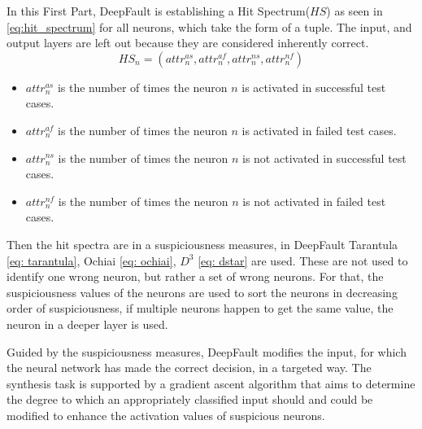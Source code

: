 In this First Part, DeepFault is establishing a Hit Spectrum($HS$) as seen in \ref{eq:hit_spectrum} for all neurons, which take the form of a tuple.
The input, and output layers are left out because they are considered inherently correct.
\begin{equation}
    HS_n = (attr_n^{as}, attr_n^{af}, attr_n^{ns}, attr_n^{nf})\label{eq:hit_spectrum}
\end{equation}
\begin{itemize}
    \item $attr^{as}_n$ is the number of times the neuron $n$ is activated in successful test cases.
    \item $attr^{af}_n$ is the number of times the neuron $n$ is activated in failed test cases.
    \item $attr^{ns}_n$ is the number of times the neuron $n$ is not activated in successful test cases.
    \item $attr^{nf}_n$ is the number of times the neuron $n$ is not activated in failed test cases.
\end{itemize}
Then the hit spectra are in a suspiciousness measures, in DeepFault Tarantula \ref{eq: tarantula}, Ochiai \ref{eq: ochiai}, $D^3$ \ref{eq: dstar} are used.
These are not used to identify one wrong neuron, but rather a set of wrong neurons.
For that, the suspiciousness values of the neurons are used to sort the neurons in decreasing order of suspiciousness, if multiple neurons happen to get the same value, the neuron in a deeper layer is used.

Guided by the suspiciousness measures, DeepFault modifies the input, for which the neural network has made the correct decision, in a targeted way.
The synthesis task is supported by a gradient ascent algorithm that aims to determine the degree to which an appropriately classified input should and could be modified to enhance the activation values of suspicious neurons.